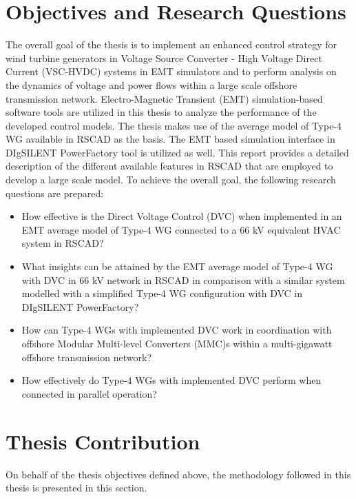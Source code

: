 \section{Objectives and Research Questions}
The overall goal of the thesis is to implement an enhanced control strategy for wind turbine generators in Voltage Source Converter - High Voltage Direct Current (\gls{VSC}-\gls{HVDC}) systems in \gls{EMT} simulators and to perform analysis on the dynamics of voltage and power flows within a large scale offshore transmission network. Electro-Magnetic Transient (\gls{EMT}) simulation-based software tools are utilized in this thesis to analyze the performance of the developed control models. The thesis makes use of the average model of Type-4 \gls{WG} available in RSCAD as the basis. The \gls{EMT} based simulation interface in DIgSILENT PowerFactory tool is utilized as well. This report provides a detailed description of the different available features in RSCAD that are employed to develop a large scale model. 
To achieve the overall goal, the following research questions are prepared:
\begin{itemize}
    \item How effective is the Direct Voltage Control (\gls{DVC}) when implemented in an \gls{EMT} average model of Type-4 \gls{WG} connected to a 66 kV equivalent \gls{HVAC} system in RSCAD?
    
    \item What insights can be attained by the \gls{EMT} average model of Type-4 \gls{WG} with \gls{DVC} in 66 kV network in RSCAD in comparison with a similar system modelled with a simplified Type-4 \gls{WG} configuration with \gls{DVC} in DIgSILENT PowerFactory?
    
    \item How can Type-4 \gls{WG}s with implemented \gls{DVC} work in coordination with offshore Modular Multi-level Converters (\gls{MMC})s within a multi-gigawatt offshore transmission network?
    
    \item How effectively do Type-4 \gls{WG}s with implemented \gls{DVC} perform when connected in parallel operation?

\end{itemize}

\section{Thesis Contribution}
On behalf of the thesis objectives defined above, the methodology followed in this thesis is presented in this section.

